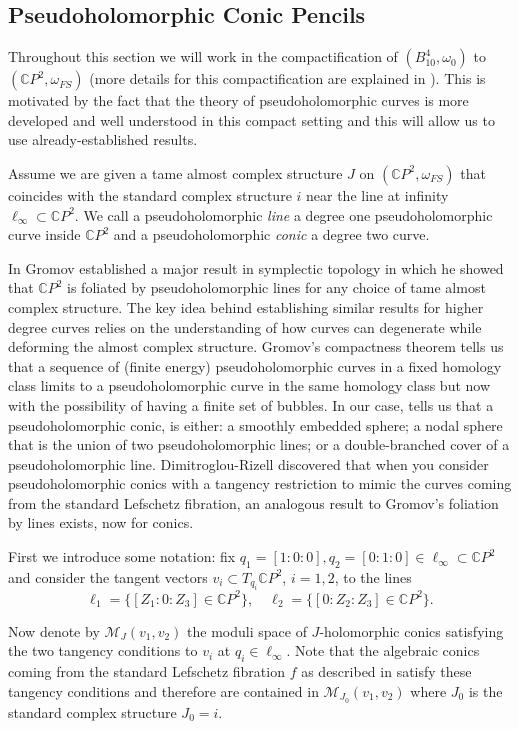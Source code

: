 \documentclass[10pt]{amsart}
\theoremstyle{plain}
\theoremstyle{definition}
\numberwithin{equation}{section}
\newcommand{\C}{\mathbb{C}}
\newcommand{\sse}{\subset}
\begin{document}
\subsection{Pseudoholomorphic Conic Pencils}\label{conicpencil}
Throughout this section we will work in the compactification of $(B_{10}^4,\omega_0)$ to $(\C P^2, \omega_{FS})$ (more details for this compactification are explained in  ). This is motivated by the fact that the theory of pseudoholomorphic curves is more developed and well understood in this compact setting and this will allow us to use already-established results.

Assume we are given a tame almost complex structure $J$ on $(\C P^2, \omega_{FS})$ that coincides with the standard complex structure $i$ near the line at infinity $\ell_\infty\sse \C P^2$. We call a pseudoholomorphic \textit{line} a degree one pseudoholomorphic curve inside $\C P^2$ and a pseudoholomorphic \textit{conic} a degree two curve. 

In \cite{Gromov85_PseudoholCurves} Gromov established a major result in symplectic topology in which he showed that $\C P^2$ is foliated by pseudoholomorphic lines for any choice of tame almost complex structure. The key idea behind establishing similar results for higher degree curves relies on the understanding of how curves can degenerate while deforming the almost complex structure. Gromov's compactness theorem \cite{Gromov85_PseudoholCurves} tells us that a sequence of (finite energy) pseudoholomorphic curves in a fixed homology class limits to a pseudoholomorphic curve in the same homology class but now with the possibility of having a finite set of bubbles. In our case, \cite[Lemma 4.2]{DR19_WhitneySphere}  tells us that a pseudoholomorphic conic, is either: a smoothly embedded sphere; a nodal sphere that is the union of two pseudoholomorphic lines; or a double-branched cover of a pseudoholomorphic line. Dimitroglou-Rizell discovered that when you consider pseudoholomorphic conics with a tangency restriction to mimic the curves coming from the standard Lefschetz fibration, an analogous result to Gromov's foliation by lines exists, now for conics.

First we introduce some notation: fix $q_1=[1:0:0],q_2=[0:1:0]\in \ell_\infty\sse \C P^2$ and consider the tangent vectors $v_i\sse T_{q_i}\C P^2$, $i=1,2$, to the lines
$$\ell_1 = \{[Z_1:0:Z_3]\in \C P^2\},\quad \ell_2=\{[0:Z_2:Z_3]\in \C P^2\}.$$

Now denote by $\mathcal{M}_J(v_1,v_2)$ the moduli space of $J$-holomorphic conics satisfying the two tangency conditions to $v_i$ at $q_i\in \ell_\infty$. Note that the algebraic conics coming from the standard Lefschetz fibration $f$ as described in  satisfy these tangency conditions and therefore are contained in $\mathcal{M}_{J_0}(v_1,v_2)$ where $J_0$ is the standard complex structure $J_0=i$.
\end{document}
